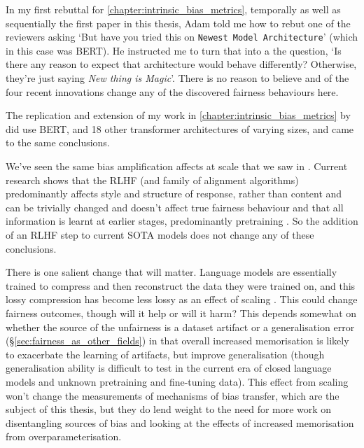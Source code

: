 In my first rebuttal for \ref{chapter:intrinsic_bias_metrics}, temporally as well as sequentially the first paper in this thesis, Adam told me how to rebut one of the reviewers asking `But have you tried this on {\tt Newest Model Architecture}' (which in this case was BERT). He instructed me to turn that into a the question, `Is there any reason to expect that architecture would behave differently? Otherwise, they're just saying \textit{New thing is Magic}'. There is no reason to believe and of the four recent innovations change any of the discovered fairness behaviours here.

The replication and extension of my work in \ref{chapter:intrinsic_bias_metrics} by \citet{cao-etal-2022-intrinsic} did use BERT, and 18 other transformer architectures of varying sizes, and came to the same conclusions. 

We've seen the same bias amplification affects at scale \citep{} that we saw in \citet{zhao-etal-2017-men}. Current research shows that the RLHF (and family of alignment algorithms) predominantly affects style and structure of response, rather than content \citep{min-etal-2022-rethinking,  lin2023unlocking} and can be trivially changed and doesn't affect true fairness behaviour \citep{qi2023finetuning} and that all information is learnt at earlier stages, predominantly pretraining \citep{zhou2023lima}.
So the addition of an RLHF step to current SOTA models does not change any of these conclusions.

There is one salient change that will matter. Language models are essentially trained to compress and then reconstruct the data they were trained on, and this lossy compression has become less lossy as an effect of scaling \citep{karamolegkou-etal-2023-copyright}. This could change fairness outcomes, though will it help or will it harm? This depends somewhat on whether the source of the unfairness is a dataset artifact or a generalisation error (\S \ref{sec:fairness_as_other_fields}) in that overall increased memorisation is likely to exacerbate the learning of artifacts, but improve generalisation (though generalisation ability is difficult to test in the current era of closed language models and unknown pretraining and fine-tuning data). This effect from scaling won't change the measurements of mechanisms of bias transfer, which are the subject of this thesis, but they do lend weight to the need for more work on disentangling sources of bias and looking at the effects of increased memorisation from overparameterisation. 

